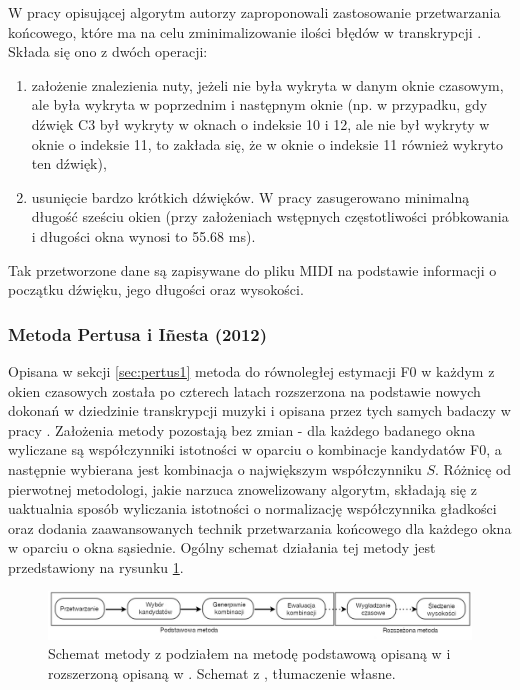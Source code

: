 \documentclass[12pt,a4paper,twoside]{mwart}
\begin{document}
W pracy opisującej algorytm autorzy zaproponowali zastosowanie przetwarzania końcowego, które ma na celu zminimalizowanie ilości błędów w transkrypcji 
\cite[106-107]{Transcription:Pertus:Inharmonicity}.
Składa się ono z dwóch operacji:
\begin{enumerate}
  \item założenie znalezienia nuty, jeżeli nie była wykryta w danym oknie czasowym, ale była wykryta w poprzednim i następnym oknie (np. w przypadku, gdy dźwięk C3 był wykryty w oknach o indeksie 10 i 12, ale nie był wykryty w oknie o indeksie 11, to zakłada się, że w oknie o indeksie 11 również wykryto ten dźwięk),
  \item usunięcie bardzo krótkich dźwięków. W pracy zasugerowano minimalną długość sześciu okien (przy założeniach wstępnych częstotliwości próbkowania i długości okna wynosi to 55.68 ms).
\end{enumerate}
Tak przetworzone dane są zapisywane do pliku MIDI na podstawie informacji o początku dźwięku, jego długości oraz wysokości.

\subsubsection{Metoda Pertusa i Iñesta (2012)}\label{sec:petrus2}
Opisana w sekcji \ref{sec:pertus1} metoda do równoległej estymacji F0 w każdym z okien czasowych została po czterech latach rozszerzona na podstawie nowych dokonań w dziedzinie transkrypcji muzyki i opisana przez tych samych badaczy w pracy \cite{Transcription:Pertus:Inharmonicity2}. Założenia metody pozostają bez zmian - dla każdego badanego okna wyliczane są współczynniki istotności w oparciu o kombinacje kandydatów F0, a następnie wybierana jest kombinacja o największym współczynniku $S$. Różnicę od pierwotnej metodologi, jakie narzuca znowelizowany algorytm, składają się z uaktualnia sposób wyliczania istotności o normalizację współczynnika gładkości oraz dodania zaawansowanych technik przetwarzania końcowego dla każdego okna w oparciu o okna sąsiednie. Ogólny schemat działania tej metody jest przedstawiony na rysunku \ref{fig:petrusa_2012_methodology}.

\begin{figure}[ht]
  \begin{center}
    \includegraphics[scale=0.31]{images/Pertusa_2012_methodology.png}
    \caption{Schemat metody z podziałem na metodę podstawową opisaną w \cite{Transcription:Pertus:Inharmonicity} i rozszerzoną opisaną w \cite{Transcription:Pertus:Inharmonicity2}. Schemat z \cite[3]{Transcription:Pertus:Inharmonicity2}, tłumaczenie własne.}
    \label{fig:petrusa_2012_methodology}
  \end{center}
\end{figure}
\end{document}
